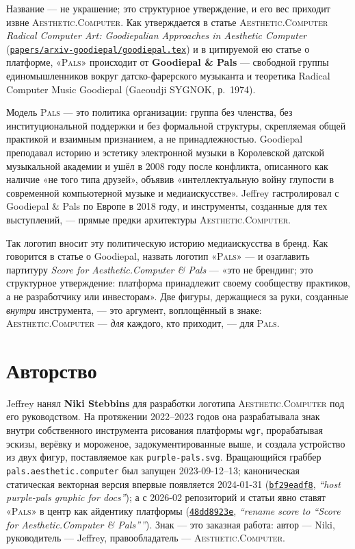 \documentclass[10pt,letterpaper,twocolumn]{article}
\newcommand{\ac}{\textsc{Aesthetic}{\color{acpink}.}\textsc{Computer}}
\newcommand{\pals}{\textsc{Pals}}
\newcommand{\commit}[2]{\href{https://github.com/whistlegraph/aesthetic-computer/commit/#1}{\texttt{#1}}, \emph{``#2''}}
\newcommand{\repofile}[1]{\href{https://github.com/whistlegraph/aesthetic-computer/blob/main/#1}{\texttt{#1}}}
\begin{document}
Название --- не украшение; это структурное утверждение, и его вес приходит
извне \ac{}. Как утверждается в статье \ac{}
\emph{Radical Computer Art: Goodiepalian Approaches in Aesthetic
Computer} (\repofile{papers/arxiv-goodiepal/goodiepal.tex}) и в цитируемой
ею статье о платформе, «\pals{}» происходит от \textbf{Goodiepal \&
Pals} --- свободной группы единомышленников вокруг датско-фарерского
музыканта и теоретика Radical Computer Music Goodiepal (Gaeoudji SYGNOK,
р.~1974).

Модель \pals{} --- это политика организации: группа без членства, без
институциональной поддержки и без формальной структуры, скрепляемая общей
практикой и взаимным признанием, а не принадлежностью. Goodiepal преподавал
историю и эстетику электронной музыки в Королевской датской музыкальной
академии и ушёл в 2008 году после конфликта, описанного как наличие «не
того типа друзей», объявив «интеллектуальную войну глупости в современной
компьютерной музыке и медиаискусстве». Jeffrey гастролировал с Goodiepal
\& Pals по Европе в 2018 году, и инструменты, созданные для тех
выступлений, --- прямые предки архитектуры \ac{}.

Так логотип вносит эту политическую историю медиаискусства в бренд. Как
говорится в статье о Goodiepal, назвать логотип «\pals{}» --- и озаглавить
партитуру \emph{Score for Aesthetic{\color{acpink}.}Computer \& Pals} ---
«это не брендинг; это структурное утверждение: платформа принадлежит своему
сообществу практиков, а не разработчику или инвесторам». Две фигуры,
держащиеся за руки, созданные \emph{внутри} инструмента, --- это аргумент,
воплощённый в знаке: \ac{} --- \emph{для} каждого, кто приходит, --- для
\pals{}.

\section{Авторство}

Jeffrey нанял \textbf{Niki Stebbins} для разработки логотипа \ac{} под его
руководством. На протяжении 2022--2023 годов она разрабатывала знак внутри
собственного инструмента рисования платформы \texttt{wgr}, прорабатывая
эскизы, верёвку и мороженое, задокументированные выше, и создала устройство
из двух фигур, поставляемое как \texttt{purple-pals.svg}. Вращающийся
граббер \texttt{pals.aesthetic.computer} был запущен 2023-09-12--13;
каноническая статическая векторная версия впервые появляется 2024-01-31
(\commit{bf29eadf8}{host purple-pals graphic for docs}); а с 2026-02
репозиторий и статьи явно ставят «\pals{}» в центр как айдентику платформы
(\commit{48dd8923e}{rename score to ``Score for
Aesthetic.Computer \& Pals''}). Знак --- это заказная работа: автор ---
Niki, руководитель --- Jeffrey, правообладатель --- \ac{}.
\end{document}
